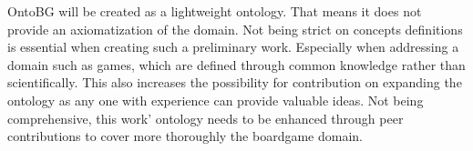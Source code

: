 OntoBG will be created as a lightweight ontology. That means it does not provide an axiomatization of the domain. Not being strict on concepts definitions is essential when creating such a preliminary work. Especially when addressing a domain such as games, which are defined through common knowledge rather than scientifically. This also increases the possibility for contribution on expanding the ontology as any one with experience can provide valuable ideas. Not being comprehensive, this work' ontology needs to be enhanced through peer contributions to cover more thoroughly the boardgame domain.
